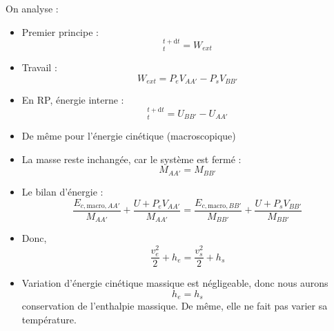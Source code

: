 On analyse : 
\begin{itemize}

    \item Premier principe :
      \begin{equation}
        [E _{c, \text{macro}} + U] _t ^{t + \mathrm{d}t} = W _{ext}
      \end{equation}

    \item Travail : 
      \begin{equation}
        W _{ext} = P_e V _{A A'} - P_s V _{B B'}
      \end{equation}

    \item En RP, énergie interne : 
      \begin{equation}
        [U]_t ^{t + \mathrm{d}t} = U _{BB'} - U _{A A'}
      \end{equation}

    \item De même pour l'énergie cinétique (macroscopique)
    \item La masse reste inchangée, car le système est fermé : 
      \begin{equation}
        M _{A A'} = M _{B B'}
      \end{equation}
    \item Le bilan d'énergie : 
      \begin{equation}
        \frac{E _{c, \text{macro}, A A'}}{M _{A A'}}  + \frac{U + P_e  V _{A A'}}{M _{A A'}}  = 
        \frac{E _{c, \text{macro}, BB'}}{M _{BB'}}  + \frac{U + P_s V _{BB'}}{M _{BB'}}   
      \end{equation}

    \item Donc, 
      \begin{equation}
        \frac{v_e ^{2}}{2}  + h_e = \frac{v_s ^{2}}{2}  + h_s
      \end{equation}

    \item Variation d'énergie cinétique massique est négligeable, donc nous aurons 
      \begin{equation}
        h_e = h_s
      \end{equation}
      conservation de l'enthalpie massique. De même, elle ne fait pas varier sa température.
\end{itemize}






